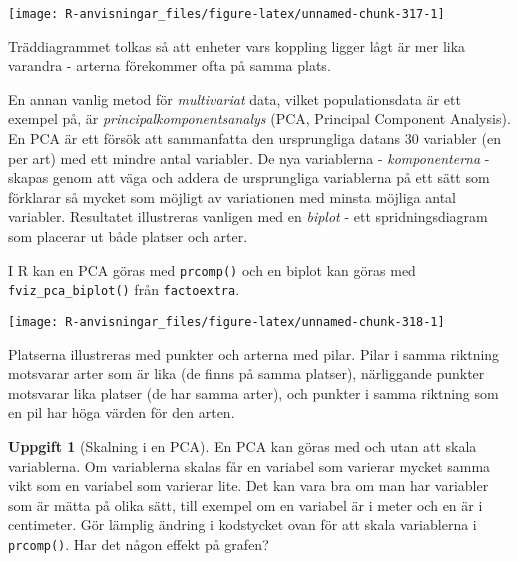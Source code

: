 \documentclass[
]{book}
\newenvironment{Shaded}{\begin{snugshade}}{\end{snugshade}}
\newcommand{\AttributeTok}[1]{\textcolor[rgb]{0.13,0.29,0.53}{#1}}
\newcommand{\DecValTok}[1]{\textcolor[rgb]{0.00,0.00,0.81}{#1}}
\newcommand{\FunctionTok}[1]{\textcolor[rgb]{0.13,0.29,0.53}{\textbf{#1}}}
\newcommand{\NormalTok}[1]{#1}
\newcommand{\OtherTok}[1]{\textcolor[rgb]{0.56,0.35,0.01}{#1}}
\newcommand{\SpecialCharTok}[1]{\textcolor[rgb]{0.81,0.36,0.00}{\textbf{#1}}}
\newcommand{\StringTok}[1]{\textcolor[rgb]{0.31,0.60,0.02}{#1}}
\theoremstyle{definition}
\theoremstyle{definition}
\theoremstyle{definition}
\newtheorem{exercise}{Uppgift}[chapter]
\theoremstyle{definition}
\theoremstyle{remark}
\begin{document}
\begin{center}\texttt{[image: R-anvisningar\_files/figure-latex/unnamed-chunk-317-1]} \end{center}

Träddiagrammet tolkas så att enheter vars koppling ligger lågt är mer lika varandra - arterna förekommer ofta på samma plats.

En annan vanlig metod för \emph{multivariat} data, vilket populationsdata är ett exempel på, är \emph{principalkomponentsanalys} (PCA, Principal Component Analysis). En PCA är ett försök att sammanfatta den ursprungliga datans 30 variabler (en per art) med ett mindre antal variabler. De nya variablerna - \emph{komponenterna} - skapas genom att väga och addera de ursprungliga variablerna på ett sätt som förklarar så mycket som möjligt av variationen med minsta möjliga antal variabler. Resultatet illustreras vanligen med en \emph{biplot} - ett spridningsdiagram som placerar ut både platser och arter.

I R kan en PCA göras med \texttt{prcomp()} och en biplot kan göras med \texttt{fviz\_pca\_biplot()} från \texttt{factoextra}.

\begin{Shaded}
\end{Shaded}

\begin{center}\texttt{[image: R-anvisningar\_files/figure-latex/unnamed-chunk-318-1]} \end{center}

Platserna illustreras med punkter och arterna med pilar. Pilar i samma riktning motsvarar arter som är lika (de finns på samma platser), närliggande punkter motsvarar lika platser (de har samma arter), och punkter i samma riktning som en pil har höga värden för den arten.

\begin{exercise}[Skalning i en PCA]
En PCA kan göras med och utan att skala variablerna. Om variablerna skalas får en variabel som varierar mycket samma vikt som en variabel som varierar lite. Det kan vara bra om man har variabler som är mätta på olika sätt, till exempel om en variabel är i meter och en är i centimeter. Gör lämplig ändring i kodstycket ovan för att skala variablerna i \texttt{prcomp()}. Har det någon effekt på grafen?
\end{exercise}
\end{document}
